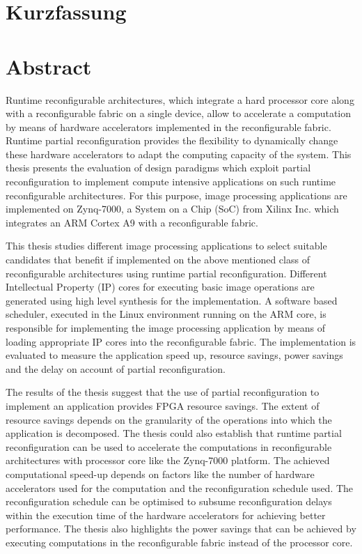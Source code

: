 \documentclass[
               paper=a4,
               BCOR1.92mm,DIV12,headinclude, %
               titlepage,
               bibliography=totoc,
               headsepline,
               cleardoublepage=empty,
               parskip=half,
	       pointlessnumbers, %
               final   %
               ]{scrreprt}
\let\ifdeutsch\iffalse
\begin{document}
\ifdeutsch
\chapter*{Kurzfassung}
\else
\chapter*{Abstract}
\fi
\begin{spacing}{1.2} 
Runtime reconfigurable architectures, which integrate a hard processor core along with a reconfigurable fabric on a single device, allow to accelerate a computation by means of hardware accelerators implemented in the reconfigurable fabric. Runtime partial reconfiguration provides the flexibility to dynamically change these hardware accelerators to adapt the computing capacity of the system. This thesis presents the evaluation of design paradigms which exploit partial reconfiguration to implement compute intensive applications on such runtime reconfigurable architectures. For this purpose, image processing applications are implemented on Zynq-7000, a System on a Chip (SoC) from Xilinx Inc. which integrates an ARM Cortex A9 with a reconfigurable fabric. 

This thesis studies different image processing applications to select suitable candidates that benefit if implemented on the above mentioned class of reconfigurable architectures using runtime partial reconfiguration. Different Intellectual Property (IP) cores for executing basic image operations are generated using high level synthesis for the implementation. A software based scheduler, executed in the Linux environment running on the ARM core, is responsible for implementing the image processing application by means of loading appropriate IP cores into the reconfigurable fabric. The implementation is evaluated to measure the application speed up, resource savings, power savings and the delay on account of partial reconfiguration. 

The results of the thesis suggest that the use of partial reconfiguration to implement an application provides FPGA resource savings. The extent of resource savings depends on the granularity of the operations into which the application is decomposed. The thesis could also establish that runtime partial reconfiguration can be used to accelerate the computations in reconfigurable architectures with processor core like the Zynq-7000 platform. The achieved computational speed-up depends on factors like the number of hardware accelerators used for the computation and the reconfiguration schedule used. The reconfiguration schedule can be optimised to subsume reconfiguration delays within the execution time of the hardware accelerators for achieving better performance. The thesis also highlights the power savings that can be achieved by executing computations in the reconfigurable fabric instead of the processor core. 
\end{spacing}
\cleardoublepage
\end{document}
